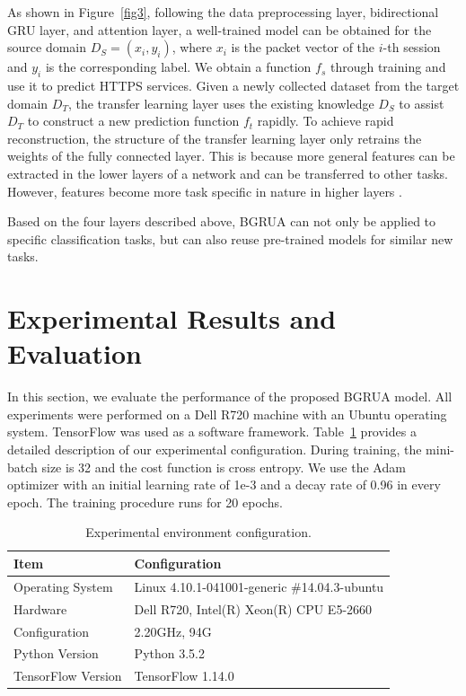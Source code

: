 \documentclass[preprint,12pt]{elsarticle}
\begin{document}
As shown in Figure~\ref{fig3}, following the data preprocessing layer, bidirectional GRU layer, and attention layer, a well-trained model can be obtained for the source domain $D_S = (x_i, y_i)$, where $x_i$ is the packet vector of the $i$-th session and $y_i$ is the corresponding label. We obtain a function $f_s$ through training and use it to predict HTTPS services. Given a newly collected dataset from the target domain $D_T$, the transfer learning layer uses the existing knowledge $D_S$ to assist $D_T$ to construct a new prediction function $f_t$ rapidly. To achieve rapid reconstruction, the structure of the transfer learning layer only retrains the weights of the fully connected layer. This is because more general features can be extracted in the lower layers of a network and can be transferred to other tasks. However, features become more task specific in nature in higher layers \cite{KAYA201920}. 

Based on the four layers described above, BGRUA can not only be applied to specific classification tasks, but can also reuse pre-trained models for similar new tasks.






\section{Experimental Results and Evaluation}
In this section, we evaluate the performance of the proposed BGRUA model. All experiments were performed on a Dell R720 machine with an Ubuntu operating system. TensorFlow was used as a software framework. Table~\ref{tab3} provides a detailed description of our experimental configuration. During training, the mini-batch size is 32 and the cost function is cross entropy. We use the Adam optimizer with an initial learning rate of 1e-3 and a decay rate of 0.96 in every epoch. The training procedure runs for 20 epochs.


\begin{table}[]
\centering
\caption{Experimental environment configuration.}
\label{tab3}
\begin{tabular}{l|l}
\hline
\textbf{Item}      & \textbf{Configuration}                       \\ \hline
Operating System     & Linux 4.10.1-041001-generic \#14.04.3-ubuntu \\
Hardware           & Dell R720, Intel(R) Xeon(R) CPU E5-2660      \\
Configuration      & 2.20GHz, 94G                                 \\
Python Version     & Python 3.5.2                                 \\
TensorFlow Version & TensorFlow 1.14.0                            \\ \hline
\end{tabular}
\end{table}
\end{document}
